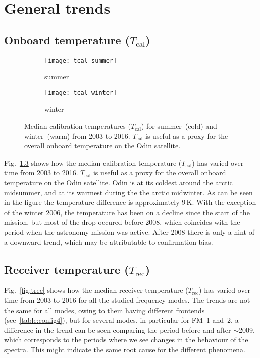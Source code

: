 \chapter{General trends}
\label{ch:general}

\section{Onboard temperature ($T_\mathrm{cal}$)}
\label{sec:Tcal}

\begin{figure}[ht]
    \centering
    \begin{subfigure}[b]{0.9545\textwidth}
        \texttt{[image: tcal\_summer]}
        \caption{summer}\label{fig:tcal:summer}
    \end{subfigure}
    \begin{subfigure}[b]{0.9545\textwidth}
        \texttt{[image: tcal\_winter]}
        \caption{winter}\label{fig:tcal:winter}
    \end{subfigure}
    \caption{Median calibration temperatures ($T_\mathrm{cal}$) for
        summer~(cold) and winter~(warm) from 2003 to 2016. $T_\mathrm{cal}$ is
        useful as a proxy for the overall onboard temperature on the Odin
        satellite.}\label{fig:tcal}
\end{figure}

\noindent
Fig.~\ref{fig:tcal} shows how the median calibration temperature
($T_\mathrm{cal}$) has varied over time from 2003 to 2016.  $T_\mathrm{cal}$ is
useful as a proxy for the overall onboard temperature on the Odin satellite.
Odin is at its coldest around the arctic midsummer, and at its warmest during
the the arctic midwinter.  As can be seen in the figure the temperature
difference is approximately $9\,\mathrm{K}$.  With the exception of the
winter 2006, the temperature has been on a decline since the start of the
mission, but most of the drop occured before 2008, which coincides with the
period when the astronomy mission was active.  After 2008 there is only a hint
of a downward trend, which may be attributable to confirmation bias.


\section{Receiver temperature ($T_\mathrm{rec}$)}
\label{sec:Trec}
Fig.~\ref{fig:trec} shows how the median receiver temperature
($T_\mathrm{rec}$) has varied over time from 2003 to 2016 for all the studied
frequency modes.  The trends are not the same for all modes, owing to them
having different frontends (see~\ref{table:config4}), but for several modes,
in particular for FM~1 and~2, a difference in the trend can be seen comparing
the period before and after $\sim$2009, which corresponds to the periods where
we see changes in the behaviour of the spectra.  This might indicate the same
root cause for the different phenomena.

